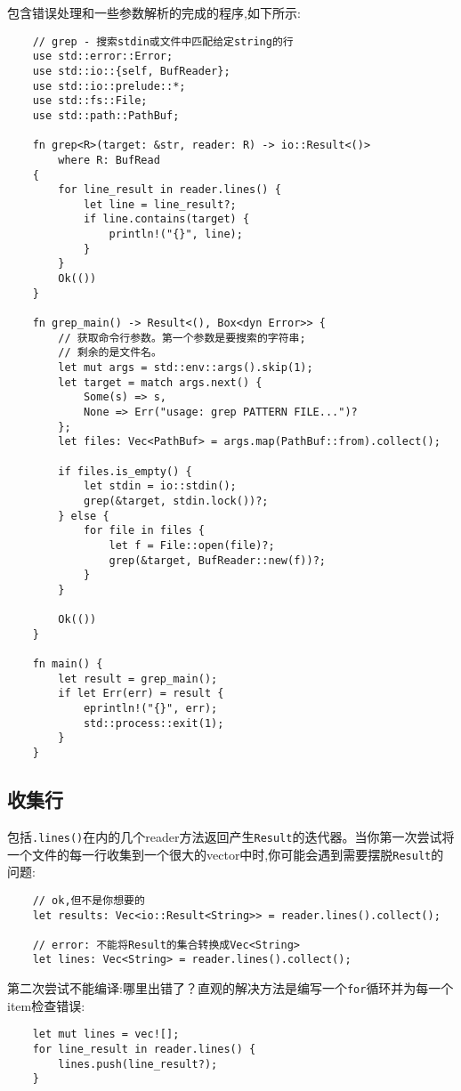 包含错误处理和一些参数解析的完成的程序,如下所示:
\begin{verbatim}
    // grep - 搜索stdin或文件中匹配给定string的行
    use std::error::Error;
    use std::io::{self, BufReader};
    use std::io::prelude::*;
    use std::fs::File;
    use std::path::PathBuf;

    fn grep<R>(target: &str, reader: R) -> io::Result<()>
        where R: BufRead
    {
        for line_result in reader.lines() {
            let line = line_result?;
            if line.contains(target) {
                println!("{}", line);
            }
        }
        Ok(())
    }

    fn grep_main() -> Result<(), Box<dyn Error>> {
        // 获取命令行参数。第一个参数是要搜索的字符串;
        // 剩余的是文件名。
        let mut args = std::env::args().skip(1);
        let target = match args.next() {
            Some(s) => s,
            None => Err("usage: grep PATTERN FILE...")?
        };
        let files: Vec<PathBuf> = args.map(PathBuf::from).collect();

        if files.is_empty() {
            let stdin = io::stdin();
            grep(&target, stdin.lock())?;
        } else {
            for file in files {
                let f = File::open(file)?;
                grep(&target, BufReader::new(f))?;
            }
        }

        Ok(())
    }

    fn main() {
        let result = grep_main();
        if let Err(err) = result {
            eprintln!("{}", err);
            std::process::exit(1);
        }
    }
\end{verbatim}

\subsection{收集行}
包括\texttt{.lines()}在内的几个reader方法返回产生\texttt{Result}的迭代器。当你第一次尝试将一个文件的每一行收集到一个很大的vector中时,你可能会遇到需要摆脱\texttt{Result}的问题:
\begin{verbatim}
    // ok,但不是你想要的
    let results: Vec<io::Result<String>> = reader.lines().collect();

    // error: 不能将Result的集合转换成Vec<String>
    let lines: Vec<String> = reader.lines().collect();
\end{verbatim}

第二次尝试不能编译:哪里出错了？直观的解决方法是编写一个\texttt{for}循环并为每一个item检查错误:
\begin{verbatim}
    let mut lines = vec![];
    for line_result in reader.lines() {
        lines.push(line_result?);
    }
\end{verbatim}

